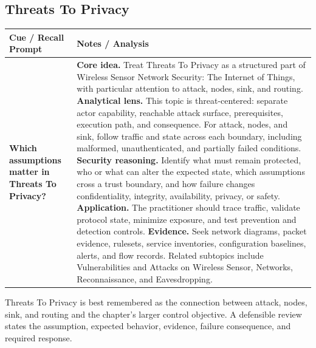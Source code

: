 \documentclass[11pt]{article}
\newcommand{\CornellHeader}{%
\rowcolor{Navy}\color{white}\bfseries Cue / Recall Prompt & \color{white}\bfseries Notes / Analysis\\\hline}
\newcommand{\CornellRow}[2]{%
\cellcolor{CueGray}\RaggedRight\textbf{#1} & \RaggedRight #2\\\hline}
\begin{document}
\subsection*{Threats To Privacy}
\begin{longtable}{>{\RaggedRight\arraybackslash}p{}|>{\RaggedRight\arraybackslash}p{}}
\CornellHeader
\CornellRow{Which assumptions matter in Threats To Privacy?}{\textbf{Core idea.} Treat Threats To Privacy as a structured part of Wireless Sensor Network Security: The Internet of Things, with particular attention to attack, nodes, sink, and routing. \textbf{Analytical lens.} This topic is threat-centered: separate actor capability, reachable attack surface, prerequisites, execution path, and consequence. For attack, nodes, and sink, follow traffic and state across each boundary, including malformed, unauthenticated, and partially failed conditions. \textbf{Security reasoning.} Identify what must remain protected, who or what can alter the expected state, which assumptions cross a trust boundary, and how failure changes confidentiality, integrity, availability, privacy, or safety. \textbf{Application.} The practitioner should trace traffic, validate protocol state, minimize exposure, and test prevention and detection controls. \textbf{Evidence.} Seek network diagrams, packet evidence, rulesets, service inventories, configuration baselines, alerts, and flow records. Related subtopics include Vulnerabilities and Attacks on Wireless Sensor, Networks, Reconnaissance, and Eavesdropping.}
\end{longtable}
\begin{topicsummary}
Threats To Privacy is best remembered as the connection between attack, nodes, sink, and routing and the chapter's larger control objective. A defensible review states the assumption, expected behavior, evidence, failure consequence, and required response.
\end{topicsummary}
\end{document}
